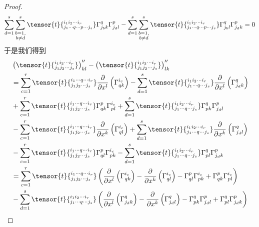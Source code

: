 \begin{proof}
\[\]
\[
\sum_{d=1}^{s}\sum_{\substack{b=1,\\ b\neq d}}^{s}\tensor{t}{^{i_{1}i_{2}\cdots  i_{r}}_{j_{1}\cdots q\cdots p\cdots j_{s}}}\Gamma_{j_{b}k}^{q}\Gamma_{j_{d}l}^{p}-\sum_{d=1}^{s}\sum_{\substack{b=1,\\ b\neq d}}^{s}\tensor{t}{^{i_{1}i_{2}\cdots  i_{r}}_{j_{1}\cdots q\cdots p\cdots j_{s}}}\Gamma_{j_{b}l}^{q}\Gamma_{j_{d}k}^{p}=0
\]
于是我们得到
\[
\begin{split}
	&\left(\tensor{t}{^{i_{1}i_{2}\cdots i_{r}}_{j_{1}j_{2}\cdots j_{s}}}\right)^{\prime\prime}_{ kl}-\left(\tensor{t}{^{i_{1}i_{2}\cdots i_{r}}_{j_{1}j_{2}\cdots j_{s}}}\right)^{\prime\prime}_{ lk}\\
	&=\sum_{c=1}^{r}\tensor{t}{^{i_{1}\cdots q\cdots i_{r}}_{j_{1}j_{2}\cdots j_{s}}}\frac{\partial  }{\partial x^{l}} \left( \Gamma_{qk}^{i_{c}} \right)-\sum_{d=1}^{s} \tensor{t}{^{i_{1}i_{2}\cdots i_{r}}_{j_{1}\cdots q\cdots j_{s}}}\frac{\partial  }{\partial x^{l}}\left(\Gamma_{j_{d}k}^{q} \right)\\
	&+\sum_{c=1}^{r}\tensor{t}{^{i_{1}\cdots q\cdots i_{r}}_{j_{1}j_{2}\cdots j_{s}}} \Gamma_{qk}^{p}\Gamma_{pl}^{i_{c}}+\sum_{d=1}^{s}\tensor{t}{^{i_{1}i_{2}\cdots  i_{r}}_{j_{1}\cdots q\cdots j_{s}}} \Gamma_{pk}^{q}\Gamma_{j_{d}l}^{p}\\
	&-\sum_{c=1}^{r}\tensor{t}{^{i_{1}\cdots q\cdots i_{r}}_{j_{1}j_{2}\cdots j_{s}}}\frac{\partial  }{\partial x^{k}} \left( \Gamma_{ql}^{i_{c}} \right) +\sum_{d=1}^{s} \tensor{t}{^{i_{1}i_{2}\cdots i_{r}}_{j_{1}\cdots q\cdots j_{s}}}\frac{\partial  }{\partial x^{k}}\left(\Gamma_{j_{d}l}^{q} \right)\\
	&-\sum_{c=1}^{r}\tensor{t}{^{i_{1}\cdots q\cdots i_{r}}_{j_{1}j_{2}\cdots j_{s}}} \Gamma_{ql}^{p}\Gamma_{pk}^{i_{c}}-\sum_{d=1}^{s}\tensor{t}{^{i_{1}i_{2}\cdots  i_{r}}_{j_{1}\cdots q\cdots j_{s}}} \Gamma_{pl}^{q}\Gamma_{j_{d}k}^{p}\\
	&=\sum_{c=1}^{r}\tensor{t}{^{i_{1}\cdots q\cdots i_{r}}_{j_{1}j_{2}\cdots j_{s}}}\left(\frac{\partial  }{\partial x^{l}} \left( \Gamma_{qk}^{i_{c}} \right)-\frac{\partial  }{\partial x^{k}} \left( \Gamma_{ql}^{i_{c}} \right)- \Gamma_{ql}^{p}\Gamma_{pk}^{i_{c}}+ \Gamma_{qk}^{p}\Gamma_{pl}^{i_{c}} \right)\\
	&-\sum_{d=1}^{s} \tensor{t}{^{i_{1}i_{2}\cdots i_{r}}_{j_{1}\cdots q\cdots j_{s}}}\left( \frac{\partial  }{\partial x^{l}}\left(\Gamma_{j_{d}k}^{q} \right)- \frac{\partial  }{\partial x^{k}}\left(\Gamma_{j_{d}l}^{q} \right)-\Gamma_{pk}^{q}\Gamma_{j_{d}l}^{p}+\Gamma_{pl}^{q}\Gamma_{j_{d}k}^{p}\right)

\end{split}\]
\end{proof}
